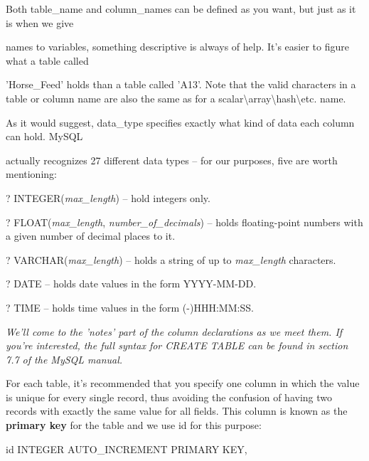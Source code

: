 \documentclass[a4paper,11pt]{book}
\begin{document}
\noindent Both table\_name and column\_names can be defined as you want, but just as it is when we give

\noindent names to variables, something descriptive is always of help. It's easier to figure what a table called

\noindent 'Horse\_Feed' holds than a table called 'A13'. Note that the valid characters in a table or column name are also the same as for a scalar\textbackslash array\textbackslash hash\textbackslash etc. name.

\noindent 

\noindent As it would suggest, data\_type specifies exactly what kind of data each column can hold. MySQL

\noindent actually recognizes 27 different data types -- for our purposes, five are worth mentioning:

\noindent 

\noindent ? INTEGER(\textit{max\_length}) -- hold integers only.

\noindent 

\noindent ? FLOAT(\textit{max\_length}, \textit{number\_of\_decimals}) -- holds floating-point numbers with a given number of decimal places to it.

\noindent 

\noindent ? VARCHAR(\textit{max\_length}) -- holds a string of up to \textit{max\_length }characters.

\noindent 

\noindent ? DATE -- holds date values in the form YYYY-MM-DD.

\noindent 

\noindent ? TIME -- holds time values in the form (-)HHH:MM:SS.

\noindent 

\noindent \textit{We'll come to the 'notes' part of the column declarations as we meet them. If you're interested, the full syntax for CREATE TABLE can be found in section 7.7 of the MySQL manual.}

\noindent 

\noindent For each table, it's recommended that you specify one column in which the value is unique for every single record, thus avoiding the confusion of having two records with exactly the same value for all fields. This column is known as the \textbf{primary key }for the table and we use id for this purpose:

\noindent 

\noindent id INTEGER AUTO\_INCREMENT PRIMARY KEY,
\end{document}
